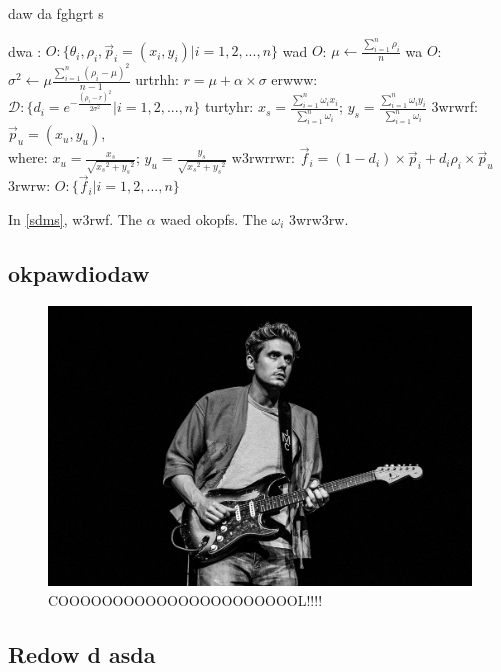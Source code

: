 \begin{algorithm}[!hbp]
	\caption{daw da fghgrt s}
    \label{sdms}
    \begin{algorithmic}
      \REQUIRE dwa : $O:\{\theta_i, \rho_i, \vec p_i=(x_i, y_i) | i = 1,2,...,n\}$
        \STATE wad  $O$: $\mu \gets \frac{\sum_{i=1}^{n} \rho_i}{n}$ 
        \STATE wa  $O$: $\sigma^2 \gets \mu \frac{\sum_{i=1}^{n} (\rho_i - \mu)^2}{n-1}$  
        \STATE urtrhh:  $r = \mu+ \alpha \times \sigma$
        \STATE erwww: $\mathcal{D}:\{d_i = e^{-\frac{(\rho_i - r)^2}{2\sigma^2} }| i = 1,2,...,n\}$
        \STATE turtyhr: $x_s = \frac{\sum_{i=1}^{n} \omega_i x_i}{\sum_{i=1}^{n}\omega_i}$; $y_s = \frac{\sum_{i=1}^{n} \omega_i y_i}{\sum_{i=1}^{n}\omega_i}$
        \STATE 3wrwrf: $\vec p_u = (x_u, y_u)$, \\
              \hspace{2em}where: $x_u = \frac{x_s}{\sqrt{{x_s}^2 + {y_s}^2}}$; $y_u = \frac{y_s}{\sqrt{{x_s}^2 + {y_s}^2}}$
        \STATE w3rwrrwr: $\vec f_i = (1-d_i)\times \vec p_i + d_i \rho_i \times \vec p_u$
        \ENSURE 3rwrw: $O:\{\vec f_i | i = 1,2,...,n\}$
    \end{algorithmic}
\end{algorithm}
In \cref{sdms}, w3rwf. 
The \( \alpha \) waed okopfs. 
The \( \omega_i \) 3wrw3rw. 



\subsection{okpawdiodaw}
\label{subsec:4}
\lipsum[4]

\begin{figure}[H]
  \centering
  \includegraphics[width=\linewidth]{author/JM.jpg}
  \caption{COOOOOOOOOOOOOOOOOOOOOOL!!!!}
  \label{fig:3}
\end{figure}

\lipsum[4]

\subsection{Redow d asda}
\label{subsec:5}
\lipsum[4]
\cite[myjournal]{myjournal}
\lipsum[4]
